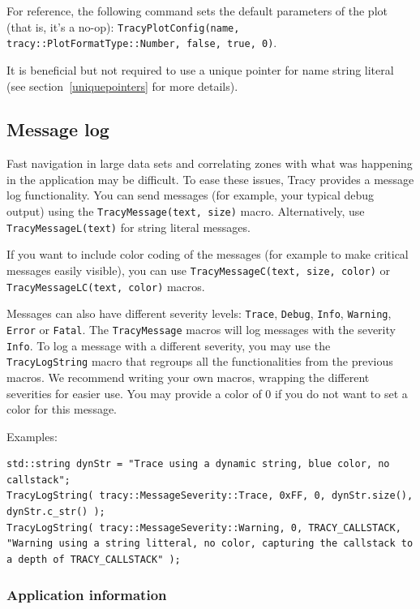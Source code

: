 \documentclass[hidelinks,titlepage,a4paper,twoside]{article}
\begin{document}
For reference, the following command sets the default parameters of the plot (that is, it's a no-op): \texttt{TracyPlotConfig(name, tracy::PlotFormatType::Number, false, true, 0)}.

It is beneficial but not required to use a unique pointer for name string literal (see section~\ref{uniquepointers} for more details).

\subsection{Message log}
\label{messagelog}

Fast navigation in large data sets and correlating zones with what was happening in the application may be difficult. To ease these issues, Tracy provides a message log functionality. You can send messages (for example, your typical debug output) using the \texttt{TracyMessage(text, size)} macro. Alternatively, use \texttt{TracyMessageL(text)} for string literal messages.

If you want to include color coding of the messages (for example to make critical messages easily visible), you can use \texttt{TracyMessageC(text, size, color)} or \texttt{TracyMessageLC(text, color)} macros.

Messages can also have different severity levels: \texttt{Trace}, \texttt{Debug}, \texttt{Info}, \texttt{Warning}, \texttt{Error} or \texttt{Fatal}. 
The \texttt{TracyMessage} macros will log messages with the severity \texttt{Info}. To log a message with a different severity, you may use the \texttt{TracyLogString} macro that regroups all the functionalities from the previous macros. We recommend writing your own macros, wrapping the different severities for easier use. You may provide a color of 0 if you do not want to set a color for this message.

Examples:
\begin{lstlisting}
std::string dynStr = "Trace using a dynamic string, blue color, no callstack";
TracyLogString( tracy::MessageSeverity::Trace, 0xFF, 0, dynStr.size(), dynStr.c_str() );
TracyLogString( tracy::MessageSeverity::Warning, 0, TRACY_CALLSTACK, "Warning using a string litteral, no color, capturing the callstack to a depth of TRACY_CALLSTACK" );
\end{lstlisting}


\subsubsection{Application information}
\label{appinfo}
\end{document}
